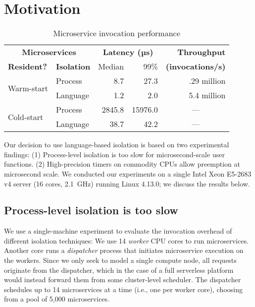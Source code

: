 \section{Motivation}
\label{sec:motive}

\begin{table}
\begin{center}
\small
\begin{tabular}{llrrr}
  \multicolumn{2}{c}{\textbf{Microservices}} & \multicolumn{2}{c}{\textbf{Latency (µs)}} & \textbf{Throughput} \\
  \textbf{Resident?} & \textbf{Isolation} & Median & 99\% & \textbf{(invocations/s)} \\
\midrule
\multirow{2}{*}{Warm-start} & Process & 8.7 & 27.3 & .29 million \\
& Language & 1.2 & 2.0 & 5.4 million \\
\midrule
\multirow{2}{*}{Cold-start} & Process & 2845.8 & 15976.0 & \multicolumn{1}{c}{---} \\
& Language & 38.7 & 42.2 & \multicolumn{1}{c}{---} \\
\end{tabular}
\caption{Microservice invocation performance}
\label{tab:invocperf}
\end{center}
\end{table}

Our decision to use language-based isolation is based on two experimental
findings:  (1) Process-level isolation is too slow for
microsecond-scale user functions. (2) High-precision timers on commodity
CPUs allow preemption at microsecond scale.  We conducted our experiments
on a single Intel Xeon E5-2683 v4 server (16 cores, 2.1~GHz) running
Linux 4.13.0; we discuss the results below.

\subsection{Process-level isolation is too slow}
We use a single-machine experiment to evaluate the invocation overhead of different
isolation techniques: We use 14 \emph{worker} CPU cores to run microservices. Another
core runs a \emph{dispatcher} process that initiates microservice execution on the
workers.  Since we only seek to model a single compute node, all requests originate
from the dispatcher, which in the case of a full serverless platform would instead
forward them from some cluster-level scheduler.  The dispatcher schedules up to 14
microservices at a time (i.e., one per worker core), choosing from a pool of 5,000
microservices.

